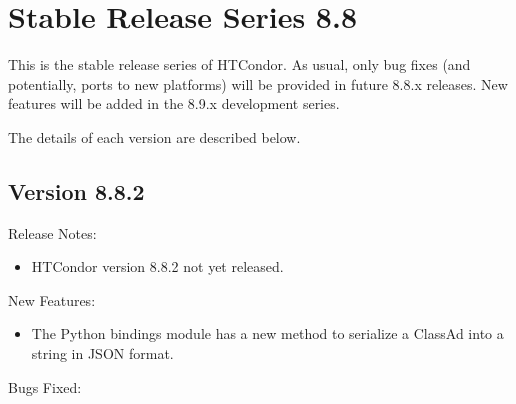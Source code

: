 
\section{Stable Release Series 8.8}\label{sec:History-8-8}

This is the stable release series of HTCondor.
As usual, only bug fixes (and potentially, ports to new platforms)
will be provided in future 8.8.x releases.
New features will be added in the 8.9.x development series.

The details of each version are described below.

\subsection*{\label{sec:New-8-8-2}Version 8.8.2}

\noindent Release Notes:

\begin{itemize}

\item HTCondor version 8.8.2 not yet released.

\end{itemize}


\noindent New Features:

\begin{itemize}

\item The Python bindings  module has
	a new  method to serialize a ClassAd
	into a string in JSON format.

\end{itemize}

\noindent Bugs Fixed:

